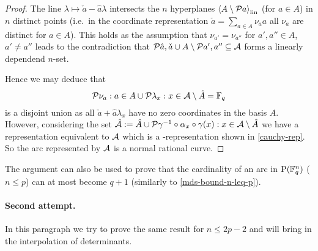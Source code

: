 \begin{proof}
    The line $\lambda\mapsto \check a-\hat a\lambda$ intersects the $n$ hyperplanes $\gen{A\setminus\set a}_{\lin}$ (for $a\in A$) in $n$ distinct points (i.e.~in the coordinate representation $\check a =\sum_{a\in A}{\nu_a a}$ all $\nu_a$ are distinct for $a\in A$). This holds as the assumption that $\nu_{a'}=\nu_{a''}$ for $a',a''\in A$, $a'\neq a''$ leads to the contradiction that $\set{\hat a,\check a}\setjoin A\setminus\set{a',a''}\setleq \cA$ forms a linearly dependend $n$-set.

    Hence we may deduce that
    $$
    \set{\nu_a:a\in A}\setjoin\set{\lambda_x:x\in \cA\setminus\hat A}=\field{q}
    $$ is a disjoint union as all $\check a+\hat a\lambda_x$ have no zero coordinates in the basis $A$. However, considering the set $\hat\cA:=\hat A\setjoin\set{\gamma^{-1}\compose\alpha_x\compose\gamma(x):x\in \cA\setminus\hat A}$ we have a representation equivalent to $\mathcal{A}$ which is a -representation shown in \autoref{cauchy-rep}. So the arc represented by $\mathcal{A}$ is a normal rational curve.
\end{proof}

\begin{remark}
    The argument can also be used to prove that the cardinality of an arc in $\P(\field{q}^n)$ ($n\leq p$) can at most become $q+1$ (similarly to \autoref{mds-bound-n-leq-p}).
\end{remark}

\paragraph{Second attempt.} In this paragraph we try to prove the same result for $n\leq 2p-2$ and will bring in the interpolation of determinants.

